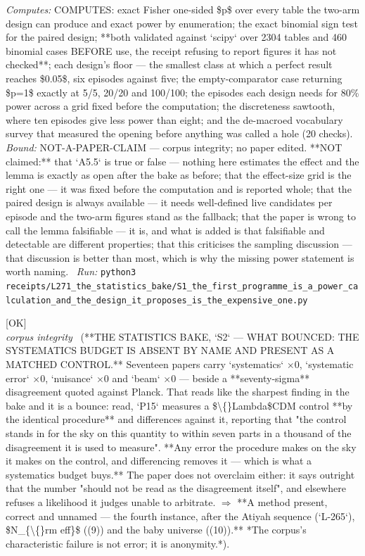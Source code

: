 \begin{description}
\emph{Computes:} COMPUTES: exact Fisher one-sided \$p\$ over every table the two-arm design can produce and exact power by enumeration; the exact binomial sign test for the paired design; **both validated against `scipy` over 2304 tables and 460 binomial cases BEFORE use, the receipt refusing to report figures it has not checked**; each design's floor --- the smallest class at which a perfect result reaches \$0.05\$, six episodes against five; the empty-comparator case returning \$p=1\$ exactly at 5/5, 20/20 and 100/100; the episodes each design needs for 80\% power across a grid fixed before the computation; the discreteness sawtooth, where ten episodes give less power than eight; and the de-macroed vocabulary survey that measured the opening before anything was called a hole (20 checks).
 \emph{Bound:} NOT-A-PAPER-CLAIM --- corpus integrity; no paper edited. **NOT claimed:** that `A5.5` is true or false --- nothing here estimates the effect and the lemma is exactly as open after the bake as before; that the effect-size grid is the right one --- it was fixed before the computation and is reported whole; that the paired design is always available --- it needs well-defined live candidates per episode and the two-arm figures stand as the fallback; that the paper is wrong to call the lemma falsifiable --- it is, and what is added is that falsifiable and detectable are different properties; that this criticises the sampling discussion --- that discussion is better than most, which is why the missing power statement is worth naming.
\ \emph{Run:} \texttt{python3 receipts/L271\_the\_statistics\_bake/S1\_the\_first\_programme\_is\_a\_power\_calculation\_and\_the\_design\_it\_proposes\_is\_the\_expensive\_one.py}
\item[\label{rcpt:S2_the_systematics_budget_is_absent_by_name_and_present_as_a_matched_control}\texttt{S2\_the\_systematics\_budget\_is\_absent\_by\_name\_and\_present\_as\_a\_matched\_control}]\hfill\textsf{[OK]}\\
\textit{corpus integrity} \ (**THE STATISTICS BAKE, `S2` --- WHAT BOUNCED: THE SYSTEMATICS BUDGET IS ABSENT BY NAME AND PRESENT AS A MATCHED CONTROL.** Seventeen papers carry `systematics` \ensuremath{\times}0, `systematic error` \ensuremath{\times}0, `nuisance` \ensuremath{\times}0 and `beam` \ensuremath{\times}0 --- beside a **seventy-sigma** disagreement quoted against Planck. That reads like the sharpest finding in the bake and it is a bounce: read, `P15` measures a \$\textbackslash\{\}Lambda\$CDM control **by the identical procedure** and differences against it, reporting that "the control stands in for the sky on this quantity to within seven parts in a thousand of the disagreement it is used to measure". **Any error the procedure makes on the sky it makes on the control, and differencing removes it --- which is what a systematics budget buys.** The paper does not overclaim either: it says outright that the number "should not be read as the disagreement itself", and elsewhere refuses a likelihood it judges unable to arbitrate. \ensuremath{\Rightarrow} **A method present, correct and unnamed --- the fourth instance, after the Atiyah sequence (`L-265`), \$N\_\{\textbackslash\{\}rm eff\}\$ ((9)) and the baby universe ((10)).** *The corpus's characteristic failure is not error; it is anonymity.*). 

\end{description}
